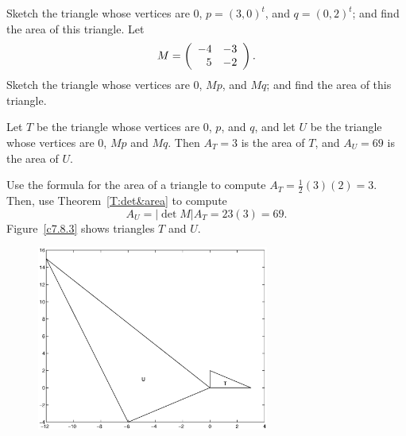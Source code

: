 \documentclass{ximera}
\begin{document}
\begin{exercise} \label{c7.8.3}
Sketch the triangle whose vertices are $0$, $p=(3,0)^t$, and
$q=(0,2)^t$; and find the area of this triangle.  Let
\[
M=\left(\begin{array}{rr} -4 & -3\\ 5 &-2\end{array}\right).
\]
Sketch the triangle whose vertices are $0$, $Mp$, and $Mq$; and
find the area of this triangle.

\begin{solution}

\ans Let $T$ be the triangle whose vertices are $0$, $p$, and $q$, and
let $U$ be the triangle whose vertices are $0$, $Mp$ and $Mq$.  Then
$A_T = 3$ is the area of $T$, and $A_U = 69$ is the area of $U$.

\soln Use the formula for the area of a triangle to compute
$A_T = \frac{1}{2}(3)(2) = 3$.  Then, use Theorem~\ref{T:det&area} to
compute
\[
A_U = |\det{M}|A_T = 23(3) = 69.
\]
Figure~\ref{c7.8.3} shows triangles $T$ and $U$.

\begin{figure}[htb]
		\centerline{%
		\includegraphics[width=3.0in]{exfigure/7-8-3.eps}}
\end{figure}

\end{solution}
\end{exercise}
\end{document}
